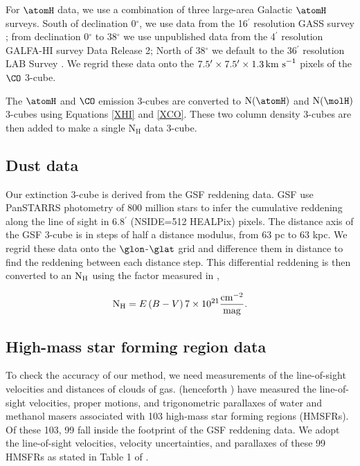 For $\atomH$ data, we use a combination of three large-area Galactic $\atomH$ surveys. 
South of declination 0$^\circ$, we use data from the 16$^\prime$ resolution GASS survey \citep{Kalberla_2010}; from declination 0$^\circ$ to 38$^\circ$ we use unpublished data from the 4$^\prime$ resolution GALFA-HI survey \citep{Peek_2011} Data Release 2; North of 38$^\circ$ we default to the 36$^\prime$ resolution LAB Survey \citep{Kalberla_2005}. 
We regrid these data onto the $7.5^\prime \times 7.5^\prime \times 1.3 {\rm \, km~s}^{-1}$ pixels of the \citet{Dame_2001} $\CO$ 3-cube.

The $\atomH$ and $\CO$ emission 3-cubes are converted to ${\rm N}(\atomH)$ and ${\rm N}(\molH)$ 3-cubes using Equations \ref{XHI} and \ref{XCO}. These two column density 3-cubes are then added to make a single $\mathrm{N_H}$ data 3-cube.


\subsection{Dust data}

Our extinction 3-cube is derived from the GSF reddening data. 
GSF use PanSTARRS photometry of 800 million stars to infer the cumulative reddening along the line of sight in 6.8$^\prime$ (NSIDE=512 HEALPix) pixels.
The distance axis of the GSF 3-cube is in steps of half a distance modulus, from 63 pc to 63 kpc. 
We regrid these data onto the \citet{Dame_2001} $\glon$-$\glat$ grid and difference them in distance to find the reddening between each distance step. 
This differential reddening is then converted to an ${\rm N_H}$ using the factor measured in \citet{Peek_2013}, 

\begin{equation}
\mathrm{N_H} = E\left(B-V\right) 7 \times 10^{21} \frac{\rm cm^{-2} }{\rm mag}. 
\end{equation}


\subsection{High-mass star forming region data}
\label{sec:data-HMSFR}
To check the accuracy of our method, we need measurements of the line-of-sight velocities and distances of clouds of gas. 
\citet{Reid:2014km}(henceforth \Reid{}) have measured the line-of-sight velocities, proper motions, and trigonometric parallaxes of water and methanol masers associated with 103 high-mass star forming regions (HMSFRs). 
Of these 103, 99 fall inside the footprint of the GSF reddening data. 
We adopt the line-of-sight velocities, velocity uncertainties, and parallaxes of these 99 HMSFRs as stated in Table 1 of \Reid{}. 
